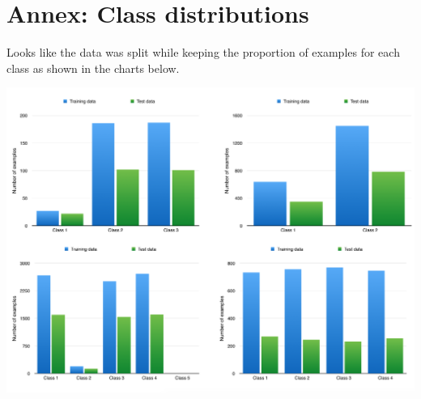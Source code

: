 \documentclass[11pt]{article}
\begin{document}
\pagebreak
\section*{Annex: Class distributions}
Looks like the data was split while keeping the proportion of examples for each class as shown in the charts below. 

\begin{center}
\includegraphics[scale=0.4]{class-distributions.png}
\end{center}
\end{document}
